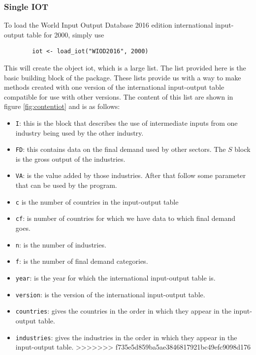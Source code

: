 \documentclass[10pt,a4paper]{paper}
\begin{document}
\begin{itemize}
	\subsubsection{Single IOT}
	
	To load the World Input Output Database 2016 edition international input-output table for 2000, simply use
	\begin{verbatim}
		iot <- load_iot("WIOD2016", 2000)
	\end{verbatim}
	This will create the object iot, which is a large list. The list provided here is the basic building block of the package. These lists provide us with a way to make methods created with one version of the international input-output table compatible for use with other versions. The content of this list are shown in figure \ref{fig:contentiot} and is as follows:
	\begin{itemize}
		\item \texttt{I}: this is the block that describes the use of intermediate inputs from one industry being used by the other industry.
		\item \texttt{FD}: this contains data on the final demand used by other sectors. The $S$ block is the gross output of the industries.
		\item \texttt{VA}: is the value added by those industries. After that follow some parameter that can be used by the program.
		\item \texttt{c} is the number of countries in the input-output table
		\item \texttt{cf}: is number of countries for which we have data to which final demand goes.
		\item \texttt{n}: is the number of industries. 
		\item \texttt{f}: is the number of final demand categories. 
		\item \texttt{year}: is the year for which the international input-output table is.
		\item \texttt{version}: is the version of the international input-output table.
		\item \texttt{countries}: gives the countries in the order in which they appear in the input-output table.
		\item \texttt{industries}: gives the industries in the order in which they appear in the input-output table.
>>>>>>> f735e5d859ba5ae3846817921bc49efc9098d176
	\end{itemize}
	

\end{itemize}
\end{document}
